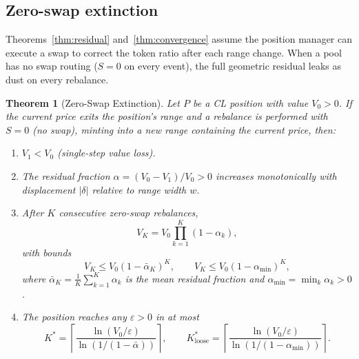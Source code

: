\documentclass[11pt,a4paper]{article}
\newtheorem{theorem}{Theorem}
\begin{document}
\subsection{Zero-swap extinction}\label{sec:extinction}

Theorems~\ref{thm:residual} and~\ref{thm:convergence} assume the position manager can execute a swap to correct the token ratio after each range change. When a pool has no swap routing ($S = 0$ on every event), the full geometric residual leaks as dust on every rebalance.

\begin{theorem}[Zero-Swap Extinction]\label{thm:extinction}
Let $P$ be a CL position with value $V_0 > 0$. If the current price exits the position's range and a rebalance is performed with $S = 0$ (no swap), minting into a new range containing the current price, then:
\begin{enumerate}[label=(\roman*),leftmargin=*]
    \item $V_1 < V_0$ (single-step value loss).
    \item The residual fraction $\alpha = (V_0 - V_1)/V_0 > 0$ increases monotonically with displacement $|\delta|$ relative to range width $w$.
    \item After $K$ consecutive zero-swap rebalances,
        \[
        V_K = V_0 \prod_{k=1}^{K}(1 - \alpha_k),
        \]
        with bounds
        \[
        V_K \leq V_0(1 - \bar\alpha_K)^K,
        \qquad
        V_K \leq V_0(1 - \alpha_{\min})^K,
        \]
        where $\bar\alpha_K = \frac{1}{K}\sum_{k=1}^K \alpha_k$ is the mean residual fraction and $\alpha_{\min} = \min_k \alpha_k > 0$.
    \item The position reaches any $\varepsilon > 0$ in at most
        \[
        K^* = \left\lceil \frac{\ln(V_0/\varepsilon)}{\ln(1/(1 - \bar\alpha))} \right\rceil,
        \qquad
        K^*_{\text{loose}} = \left\lceil \frac{\ln(V_0/\varepsilon)}{\ln(1/(1 - \alpha_{\min}))} \right\rceil.
        \]
\end{enumerate}
\end{theorem}
\end{document}
